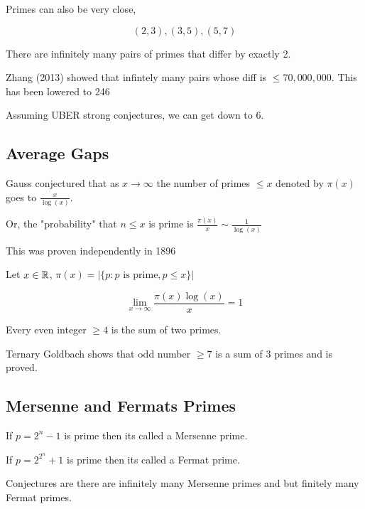 \begin{note}
    Primes can also be very close, 
    
    $$ (2,3), (3, 5), (5, 7) $$ 
\end{note}
\begin{conjecture}
    There are infinitely many pairs of primes that differ by exactly 2.
\end{conjecture}

\begin{note}
    Zhang (2013) showed that infintely many pairs whose diff is $\le 70,000,000$. This has been lowered to 246
\end{note}
\begin{note}
    Assuming UBER strong conjectures, we can get down to 6.
\end{note}

\subsection*{Average Gaps}
Gauss conjectured that as $x \rightarrow \infty$ the number of primes $\le x$ denoted by $\pi(x)$  goes to  $\frac{x}{\log(x)}$.

Or, the "probability" that $n \le x$ is prime is  $\frac{\pi(x)}{x} \sim \frac{1}{\log(x)}$ 


\begin{note}
    This was proven independently in 1896
\end{note}

\begin{definition}
    Let $x \in \mathbb{R}$,  $\pi(x) = |\{p: p \text{ is prime}, p \le x\}|$
\end{definition}

\begin{theorem}
$$ \lim_{x \to \infty}  \frac{\pi(x) \log(x)}{x} = 1 $$ 
\end{theorem}

\begin{conjecture}
    Every even integer $\ge 4$ is the sum of two primes.
\end{conjecture}

\begin{note}
Ternary Goldbach shows that odd number $\ge 7$ is a sum of 3 primes and is proved.
\end{note}
\subsection*{Mersenne and Fermats Primes}
If $p = 2^{n} - 1$ is prime then its called a Mersenne prime.

If $p = 2^{2^{n}} + 1$ is prime then its called a Fermat prime.


Conjectures are there are infinitely many Mersenne primes and but finitely many Fermat primes.


